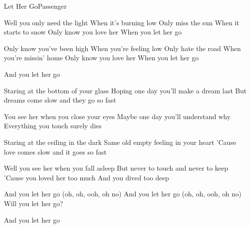\begin{Song}{Let Her Go}{Passenger}
\begin{multicols}{2}
\begin{Chorus}
Well you only need the light
When it's burning low
Only miss the sun
When it starts to snow
Only know you love her
When you let her go
\espaceInterStrophe

Only know you've been high
When you're feeling low
Only hate the road
When you’re missin' home
Only know you love her
When you let her go
\end{Chorus}
\espaceInterStrophe

\begin{Verse}
And you let her go
\espaceInterStrophe

Staring at the bottom of your glass
Hoping one day you'll make a dream last
But dreams come slow and they go so fast
\espaceInterStrophe

You see her when you close your eyes
Maybe one day you'll understand why
Everything you touch surely dies
\end{Verse}
\espaceInterStrophe

\aurefrain
\espaceInterStrophe

\begin{Verse}
Staring at the ceiling in the dark
Same old empty feeling in your heart
'Cause love comes slow and it goes so fast
\espaceInterStrophe

Well you see her when you fall asleep
But never to touch and never to keep
'Cause you loved her too much
And you dived too deep
\end{Verse}
\espaceInterStrophe

\aurefrain
\espaceInterStrophe

\begin{Chorus}
And you let her go (oh, oh, ooh, oh no)
And you let her go (oh, oh, ooh, oh no)
Will you let her go?
\end{Chorus}
\espaceInterStrophe

\aurefrain
\espaceInterStrophe

\aurefrain
\espaceInterStrophe

\begin{Verse}
And you let her go
\end{Verse}

\end{multicols}

\vfill

\begin{multicols}{2}


\end{multicols}
\end{Song}
